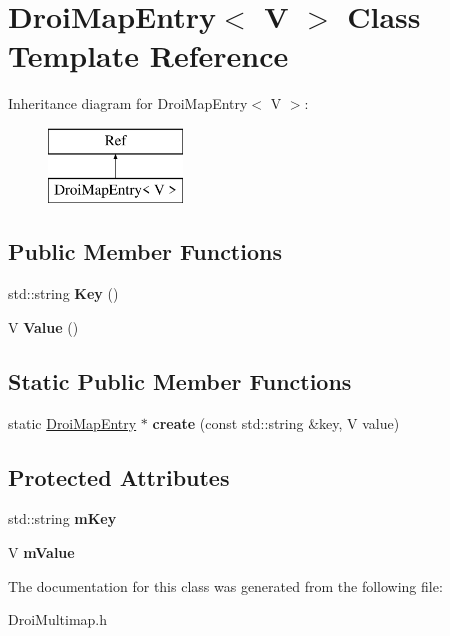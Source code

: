 \hypertarget{class_droi_map_entry}{}\section{Droi\+Map\+Entry$<$ V $>$ Class Template Reference}
\label{class_droi_map_entry}
Inheritance diagram for Droi\+Map\+Entry$<$ V $>$\+:\begin{figure}[H]
\begin{center}
\leavevmode
\includegraphics[height=2.000000cm]{d1/db5/class_droi_map_entry}
\end{center}
\end{figure}
\subsection*{Public Member Functions}
\begin{DoxyCompactItemize}
\item 
\mbox{\label{class_droi_map_entry_ae3d5c6e30f3a17fd358318c2b1376d55}} 
std\+::string {\bfseries Key} ()
\item 
\mbox{\label{class_droi_map_entry_a3b304768cc92f2e3f09b5940eaf07b6a}} 
V {\bfseries Value} ()
\end{DoxyCompactItemize}
\subsection*{Static Public Member Functions}
\begin{DoxyCompactItemize}
\item 
\mbox{\label{class_droi_map_entry_a2194971c3ad106a59a1b5984a4abe598}} 
static \hyperlink{class_droi_map_entry}{Droi\+Map\+Entry} $\ast$ {\bfseries create} (const std\+::string \&key, V value)
\end{DoxyCompactItemize}
\subsection*{Protected Attributes}
\begin{DoxyCompactItemize}
\item 
\mbox{\label{class_droi_map_entry_af6996a616a766972588f380083b24081}} 
std\+::string {\bfseries m\+Key}
\item 
\mbox{\label{class_droi_map_entry_a92f0276ff83e36d9bad641303b3dea74}} 
V {\bfseries m\+Value}
\end{DoxyCompactItemize}


The documentation for this class was generated from the following file\+:\begin{DoxyCompactItemize}
\item 
Droi\+Multimap.\+h\end{DoxyCompactItemize}
